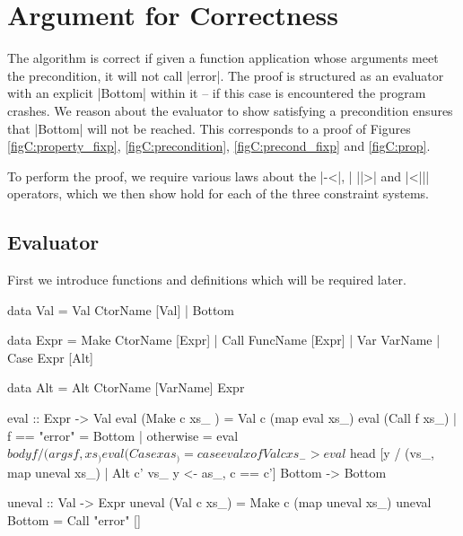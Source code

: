 

\section{Argument for Correctness}
\label{secC:correct}

\newcommand{\lemma}[1]{(\textit{#1})}
\newcommand{\theorem}[2]{#2 \hspace{5mm} \lemma{#1} \\}
\newcommand{\proof}[2][]{\paragraph{\lemma{#2} \textsf{#1}}}

The algorithm is correct if given a function application whose arguments meet the precondition, it will not call |error|. The proof is structured as an evaluator with an explicit |Bottom| within it -- if this case is encountered the program crashes. We reason about the evaluator to show satisfying a precondition ensures that |Bottom| will not be reached. This corresponds to a proof of Figures \ref{figC:property_fixp}, \ref{figC:precondition}, \ref{figC:precond_fixp} and \ref{figC:prop}.

To perform the proof, we require various laws about the |-<|, | ||>| and |<||| operators, which we then show hold for each of the three constraint systems.

\subsection{Evaluator}

First we introduce functions and definitions which will be required later.

\begin{code}
data Val  =  Val CtorName [Val]
          |  Bottom

data Expr  =  Make CtorName [Expr]
           |  Call FuncName [Expr]
           |  Var  VarName
           |  Case Expr [Alt]

data Alt = Alt CtorName [VarName] Expr

eval :: Expr -> Val
eval (Make c xs_   ) = Val c (map eval xs_)
eval (Call f xs_)  | f == "error" = Bottom
                   | otherwise = eval $ body f / (args f, xs_)
eval (Case x as_  ) = case eval x of
    Val c xs_ -> eval $ head [y / (vs_, map uneval xs_) | Alt c' vs_ y <- as_, c == c']
    Bottom -> Bottom

uneval :: Val -> Expr
uneval (Val c xs_)  = Make c (map uneval xs_)
uneval Bottom       = Call "error" []
\end{code}

